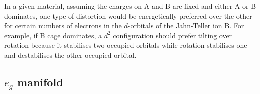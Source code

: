 \documentclass[a4paper,prb,twocolumn]{revtex4-1}  %
\newcommand{\com}[1]{}
\begin{document}
\com{
Summarise t2g results here.\\
copy from summary section...??
tilt vs rotation, preference:\\
 }


In a given material,
assuming
the charges on A and B are fixed
and either A or B dominates,
one type of distortion 
would be energetically preferred
over the other
for certain
numbers of electrons in 
the $d$-orbitals of the Jahn-Teller ion B.
For example,
if B cage dominates,
a $d^2$ configuration
should prefer tilting over rotation
because it stabilises two occupied orbitals 
while rotation stabilises one and destabilises the other occupied orbital.

 



\subsection{$e_{g}$ manifold}
\label{sec:eg-gen}


\com{
So we consider the general case of

both theta phi couples the two states..... expressions relatively longer, but, can be approximated by simpler expressions obtained by an expansion about zero angles.... 

simpler expressions of eigenstates and eigenvalues.... in terms of D2 and D4 terms of A and B.

presentation and discussion of eg splitting...
combined plots for the three cases w.r.t  angles... as three  rows
and two q values on the opposite side of the crossover...
so 2x3 panel figure.
}
\end{document}
